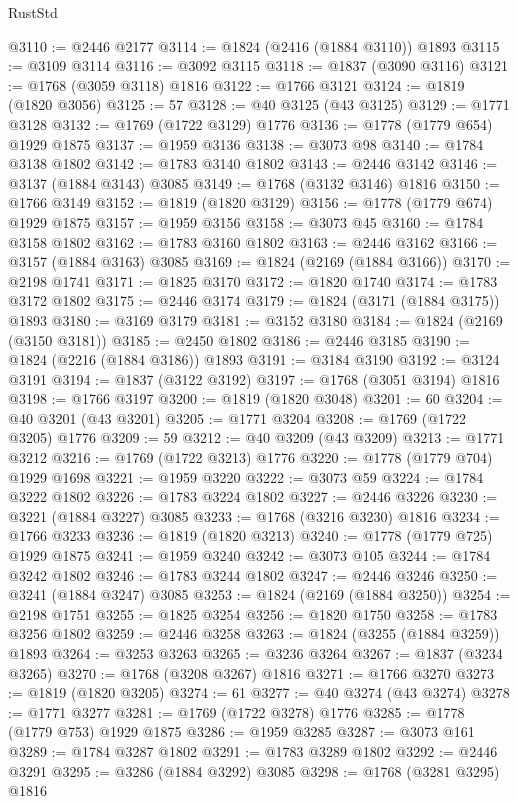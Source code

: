 \begin{lexlean}{RustStd}
\begin{coremodule}
@3110 := @2446 @2177
@3114 := @1824 (@2416 (@1884 @3110)) @1893
@3115 := @3109 @3114
@3116 := @3092 @3115
@3118 := @1837 (@3090 @3116)
@3121 := @1768 (@3059 @3118) @1816
@3122 := @1766 @3121
@3124 := @1819 (@1820 @3056)
@3125 := 57
@3128 := @40 @3125 (@43 @3125)
@3129 := @1771 @3128
@3132 := @1769 (@1722 @3129) @1776
@3136 := @1778 (@1779 @654) @1929 @1875
@3137 := @1959 @3136
@3138 := @3073 @98
@3140 := @1784 @3138 @1802
@3142 := @1783 @3140 @1802
@3143 := @2446 @3142
@3146 := @3137 (@1884 @3143) @3085
@3149 := @1768 (@3132 @3146) @1816
@3150 := @1766 @3149
@3152 := @1819 (@1820 @3129)
@3156 := @1778 (@1779 @674) @1929 @1875
@3157 := @1959 @3156
@3158 := @3073 @45
@3160 := @1784 @3158 @1802
@3162 := @1783 @3160 @1802
@3163 := @2446 @3162
@3166 := @3157 (@1884 @3163) @3085
@3169 := @1824 (@2169 (@1884 @3166))
@3170 := @2198 @1741
@3171 := @1825 @3170
@3172 := @1820 @1740
@3174 := @1783 @3172 @1802
@3175 := @2446 @3174
@3179 := @1824 (@3171 (@1884 @3175)) @1893
@3180 := @3169 @3179
@3181 := @3152 @3180
@3184 := @1824 (@2169 (@3150 @3181))
@3185 := @2450 @1802
@3186 := @2446 @3185
@3190 := @1824 (@2216 (@1884 @3186)) @1893
@3191 := @3184 @3190
@3192 := @3124 @3191
@3194 := @1837 (@3122 @3192)
@3197 := @1768 (@3051 @3194) @1816
@3198 := @1766 @3197
@3200 := @1819 (@1820 @3048)
@3201 := 60
@3204 := @40 @3201 (@43 @3201)
@3205 := @1771 @3204
@3208 := @1769 (@1722 @3205) @1776
@3209 := 59
@3212 := @40 @3209 (@43 @3209)
@3213 := @1771 @3212
@3216 := @1769 (@1722 @3213) @1776
@3220 := @1778 (@1779 @704) @1929 @1698
@3221 := @1959 @3220
@3222 := @3073 @59
@3224 := @1784 @3222 @1802
@3226 := @1783 @3224 @1802
@3227 := @2446 @3226
@3230 := @3221 (@1884 @3227) @3085
@3233 := @1768 (@3216 @3230) @1816
@3234 := @1766 @3233
@3236 := @1819 (@1820 @3213)
@3240 := @1778 (@1779 @725) @1929 @1875
@3241 := @1959 @3240
@3242 := @3073 @105
@3244 := @1784 @3242 @1802
@3246 := @1783 @3244 @1802
@3247 := @2446 @3246
@3250 := @3241 (@1884 @3247) @3085
@3253 := @1824 (@2169 (@1884 @3250))
@3254 := @2198 @1751
@3255 := @1825 @3254
@3256 := @1820 @1750
@3258 := @1783 @3256 @1802
@3259 := @2446 @3258
@3263 := @1824 (@3255 (@1884 @3259)) @1893
@3264 := @3253 @3263
@3265 := @3236 @3264
@3267 := @1837 (@3234 @3265)
@3270 := @1768 (@3208 @3267) @1816
@3271 := @1766 @3270
@3273 := @1819 (@1820 @3205)
@3274 := 61
@3277 := @40 @3274 (@43 @3274)
@3278 := @1771 @3277
@3281 := @1769 (@1722 @3278) @1776
@3285 := @1778 (@1779 @753) @1929 @1875
@3286 := @1959 @3285
@3287 := @3073 @161
@3289 := @1784 @3287 @1802
@3291 := @1783 @3289 @1802
@3292 := @2446 @3291
@3295 := @3286 (@1884 @3292) @3085
@3298 := @1768 (@3281 @3295) @1816

\end{coremodule}
\end{lexlean}
